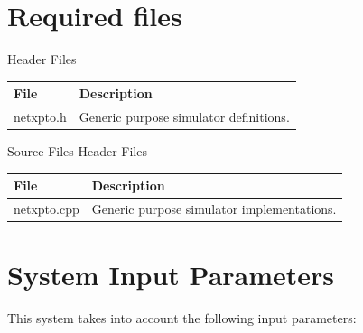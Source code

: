 \documentclass[a4paper]{article}
\begin{document}
\section{Required files}\label{Required files}
%
Header Files
\begin{savenotes}
\begin{table}[H]
\centering
\begin{tabulary}{1.0\textwidth}{|L|L|}
\hline
\textbf{File}          & \textbf{Description} 																 \\ \hline
netxpto.h              & Generic purpose simulator definitions.		          										 \\
\hline
\end{tabulary}
\end{table}		
\end{savenotes}	
%
Source Files
Header Files
\begin{savenotes}
\begin{table}[H]
\centering
\begin{tabulary}{1.0\textwidth}{|L|L|}
\hline
\textbf{File}          & \textbf{Description} 																 \\ \hline
netxpto.cpp            & Generic purpose simulator implementations.		          										 \\
\hline
\end{tabulary}
\end{table}		
\end{savenotes}	


\section{System Input Parameters}

This system takes into account the following input parameters:
\end{document}

